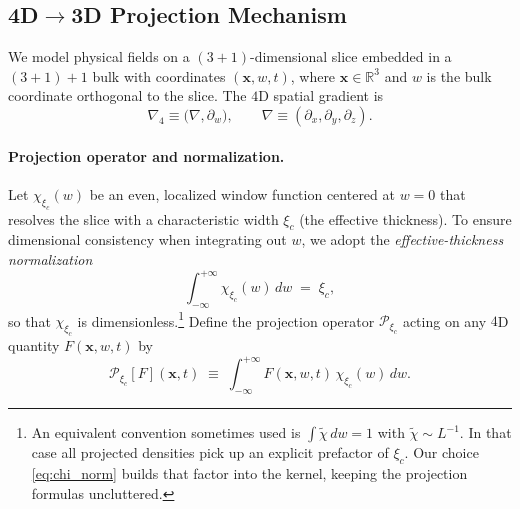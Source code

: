 \medskip
{}
\medskip

\subsection{4D$\to$3D Projection Mechanism}
\label{sec:projection_4d_to_3d}

We model physical fields on a $(3+1)$-dimensional slice embedded in a $(3+1)+1$ bulk with coordinates $(\mathbf{x},w,t)$, where $\mathbf{x}\in\mathbb{R}^3$ and $w$ is the bulk coordinate orthogonal to the slice. The $4$D spatial gradient is
\begin{equation}
\nabla_4 \equiv \big(\nabla,\partial_w\big), \qquad \nabla\equiv(\partial_x,\partial_y,\partial_z).
\end{equation}

\paragraph{Projection operator and normalization.}
Let $\chi_{\xi_c}(w)$ be an even, localized window function centered at $w=0$ that resolves the slice with a characteristic width $\xi_c$ (the effective thickness). To ensure dimensional consistency when integrating out $w$, we adopt the \emph{effective-thickness normalization}
\begin{equation}
\int_{-\infty}^{+\infty} \chi_{\xi_c}(w)\,dw \;=\; \xi_c,
\label{eq:chi_norm}
\end{equation}
so that $\chi_{\xi_c}$ is dimensionless.\footnote{An equivalent convention sometimes used is $\int \tilde\chi\,dw=1$ with $\tilde\chi\sim L^{-1}$. In that case all projected densities pick up an explicit prefactor of $\xi_c$. Our choice \eqref{eq:chi_norm} builds that factor into the kernel, keeping the projection formulas uncluttered.}
Define the projection operator $\mathcal{P}_{\xi_c}$ acting on any $4$D quantity $F(\mathbf{x},w,t)$ by
\begin{equation}
\boxed{\;
\mathcal{P}_{\xi_c}[F](\mathbf{x},t)\;\equiv\;\int_{-\infty}^{+\infty} F(\mathbf{x},w,t)\,\chi_{\xi_c}(w)\,dw.
\;}
\label{eq:proj_operator}
\end{equation}

